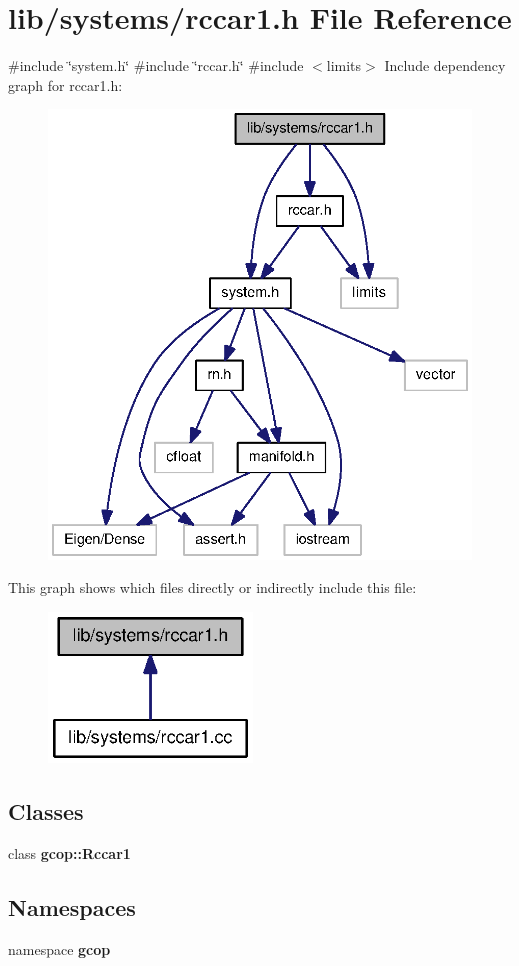 \section{lib/systems/rccar1.h \-File \-Reference}
\label{rccar1_8h}
{\ttfamily \#include \char`\"{}system.\-h\char`\"{}}\*
{\ttfamily \#include \char`\"{}rccar.\-h\char`\"{}}\*
{\ttfamily \#include $<$limits$>$}\*
\-Include dependency graph for rccar1.\-h\-:\nopagebreak
\begin{figure}[H]
\begin{center}
\leavevmode
\includegraphics[width=336pt]{rccar1_8h__incl}
\end{center}
\end{figure}
\-This graph shows which files directly or indirectly include this file\-:\nopagebreak
\begin{figure}[H]
\begin{center}
\leavevmode
\includegraphics[width=154pt]{rccar1_8h__dep__incl}
\end{center}
\end{figure}
\subsection*{\-Classes}
\begin{DoxyCompactItemize}
\item 
class {\bf gcop\-::\-Rccar1}
\end{DoxyCompactItemize}
\subsection*{\-Namespaces}
\begin{DoxyCompactItemize}
\item 
namespace {\bf gcop}
\end{DoxyCompactItemize}
